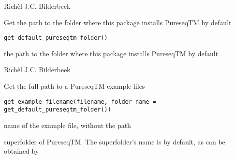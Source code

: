 \documentclass[letterpaper]{book}
\begin{document}
%
\begin{Author}\relax
Richèl J.C. Bilderbeek
\end{Author}
%
\begin{Description}\relax
Get the path to the folder where this package installs
PureseqTM by default
\end{Description}
%
\begin{Usage}
\begin{verbatim}
get_default_pureseqtm_folder()
\end{verbatim}
\end{Usage}
%
\begin{Value}
the path to the folder where this package installs
PureseqTM by default
\end{Value}
%
\begin{Author}\relax
Richèl J.C. Bilderbeek
\end{Author}
%
\begin{Examples}
\end{Examples}
%
\begin{Description}\relax
Get the full path to a PureseqTM example files
\end{Description}
%
\begin{Usage}
\begin{verbatim}
get_example_filename(filename, folder_name = get_default_pureseqtm_folder())
\end{verbatim}
\end{Usage}
%
\begin{Arguments}
\begin{ldescription}
\item[\code{filename}] name of the example file, without the path

\item[\code{folder\_name}] superfolder of PureseqTM.
The superfolder's name is 
by default, as can be obtained by
\end{ldescription}
\end{Arguments}
\end{document}
